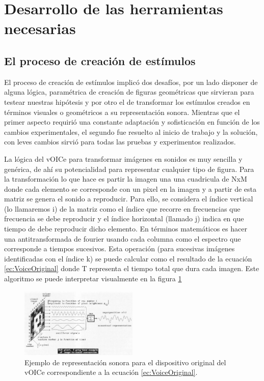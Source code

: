 \documentclass{article}
\begin{document}
\section{Desarrollo de las herramientas necesarias}

\subsection{El proceso de creación de estímulos} \label{seccion:SVG}
    
    El proceso de creación de estímulos implicó dos desafíos, por un lado disponer de alguna lógica, paramétrica de creación de figuras geométricas que sirvieran para testear nuestras hipótesis y por otro el de transformar los estímulos creados en términos visuales o geométricos a su representación sonora. Mientras que el primer aspecto requirió una constante adaptación y sofisticación en función de los cambios experimentales, el segundo fue resuelto al inicio de trabajo y la solución, con leves cambios sirvió para todas las pruebas y experimentos realizados. 
    
    La lógica del vOICe para transformar imágenes en sonidos es muy sencilla y genérica, de ahí su potencialidad para representar cualquier tipo de figura. Para la transformación lo que hace es partir la imagen una una cuadricula de NxM donde cada elemento se corresponde con un pixel en la imagen y a partir de esta matriz se genera el sonido a reproducir. Para ello, se considera el índice vertical (lo llamaremos i) de la matriz como el índice que recorre en frecuencias que frecuencia se debe reproducir y el índice horizontal (llamado j) indica en que tiempo de debe reproducir dicho elemento. En términos matemáticos es hacer una antitransformada de fourier usando cada columna como el espectro que corresponde a tiempos sucesivos. Esta operación (para sucesivas imágenes identificadas con el índice k) se puede calcular como el resultado de la ecuación \ref{ec:VoiceOriginal} donde T representa el tiempo total que dura cada imagen. Este algoritmo se puede interpretar visualmente en la figura \ref{fig:VoiceOriginal}
    
    \begin{figure}
        \center
        \includegraphics[width=0.5\textwidth]{Imagenes/VoiceOriginal.png}
        \caption{Ejemplo de representación sonora para el dispositivo original del vOICe \cite{Voice1} correspondiente a la ecuación \ref{ec:VoiceOriginal}.}
        \label{fig:VoiceOriginal}
    \end{figure}
    
\end{document}
